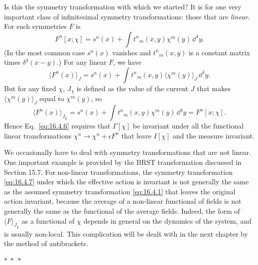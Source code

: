 Is this the symmetry transformation with which we started? It is for one very important class of infinitesimal symmetry transformations: those that are \emph{linear}. For such symmetries $F$ is
\begin{equation}
F^n[x;\chi]=s^n(x)+\int t^n{}_m(x,y)\chi^m(y)\,\dd^4y.
\tag{16.4.8}\label{eq:16.4.8}
\end{equation}
(In the most common case $s^n(x)$ vanishes and $t^n{}_m(x,y)$ is a constant matrix times $\delta^4(x-y)$.) For any linear $F$, we have
\[
\langle F^n(x)\rangle_J
=s^n(x)+\int t^n{}_m(x,y)\langle\chi^m(y)\rangle_J\,\dd^4y.
\]
But for any fixed $\chi$, $J_\chi$ is defined as the value of the current $J$ that makes $\langle\chi^m(y)\rangle_J$ equal to $\chi^m(y)$, so
\begin{equation}
\langle F^n(x)\rangle_{J_\chi}
=s^n(x)+\int t^n{}_m(x,y)\chi^m(y)\,\dd^4y
=F^n[x;\chi].
\tag{16.4.9}\label{eq:16.4.9}
\end{equation}
Hence Eq.~\eqref{eq:16.4.6} requires that $\Gamma[\chi]$ be invariant under all the functional linear transformations $\chi^n\to\chi^n+\epsilon F^n$ that leave $I[\chi]$ and the measure invariant.

We occasionally have to deal with symmetry transformations that are not linear. One important example is provided by the BRST transformation discussed in Section 15.7. For non-linear transformations, the symmetry transformation \eqref{eq:16.4.7} under which the effective action is invariant is not generally the same as the assumed symmetry transformation \eqref{eq:16.4.1} that leaves the original action invariant, because the average of a non-linear functional of fields is not generally the same as the functional of the average fields. Indeed, the form of $\langle F\rangle_{J_\chi}$ as a functional of $\chi$ depends in general on the dynamics of the system, and is usually non-local. This complication will be dealt with in the next chapter by the method of antibrackets.

\begin{center}
$*\ *\ *$
\end{center}

